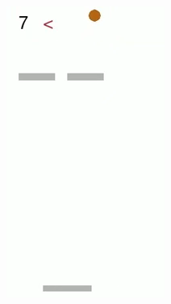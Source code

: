 \begin{figure}[h]
	~ %
	\begin{subfigure}[b]{0.18\textwidth}
		\includegraphics[width=\textwidth]{images/breakout-33-rl-tb-3.png}
	\end{subfigure}
	\begin{subfigure}[b]{0.18\textwidth}

\end{subfigure}
\end{figure}
